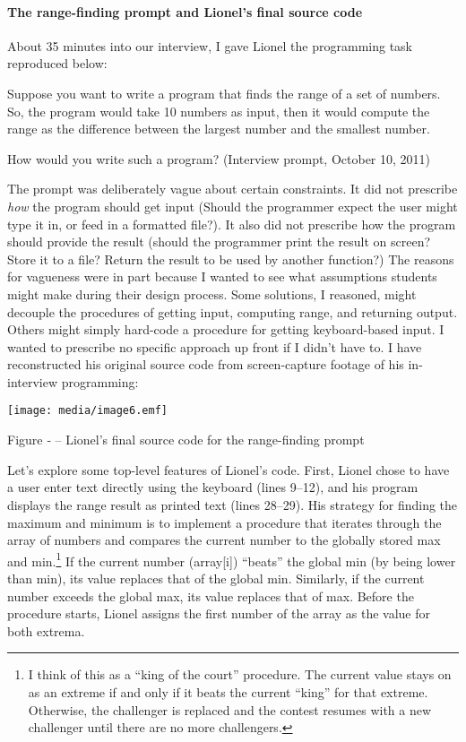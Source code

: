 \paragraph{The range-finding prompt and Lionel's final source
code}\label{the-range-finding-prompt-and-lionels-final-source-code}

About 35 minutes into our interview, I gave Lionel the programming task
reproduced below:

Suppose you want to write a program that finds the range of a set of
numbers. So, the program would take 10 numbers as input, then it would
compute the range as the difference between the largest number and the
smallest number.

How would you write such a program? (Interview prompt, October 10, 2011)

The prompt was deliberately vague about certain constraints. It did not
prescribe \emph{how} the program should get input (Should the programmer
expect the user might type it in, or feed in a formatted file?). It also
did not prescribe how the program should provide the result (should the
programmer print the result on screen? Store it to a file? Return the
result to be used by another function?) The reasons for vagueness were
in part because I wanted to see what assumptions students might make
during their design process. Some solutions, I reasoned, might decouple
the procedures of getting input, computing range, and returning output.
Others might simply hard-code a procedure for getting keyboard-based
input. I wanted to prescribe no specific approach up front if I didn't
have to. I have reconstructed his original source code from
screen-capture footage of his in-interview programming:

\texttt{[image: media/image6.emf]}

\protect\hypertarget{ux5fToc252445969}{}{}Figure ‑ -- Lionel's final
source code for the range-finding prompt

Let's explore some top-level features of Lionel's code. First, Lionel
chose to have a user enter text directly using the keyboard (lines
9--12), and his program displays the range result as printed text (lines
28--29). His strategy for finding the maximum and minimum is to
implement a procedure that iterates through the array of numbers and
compares the current number to the globally stored max and
min.\footnote{I think of this as a ``king of the court'' procedure. The
  current value stays on as an extreme if and only if it beats the
  current ``king'' for that extreme. Otherwise, the challenger is
  replaced and the contest resumes with a new challenger until there are
  no more challengers.} If the current number (array{[}i{]}) ``beats''
the global min (by being lower than min), its value replaces that of the
global min. Similarly, if the current number exceeds the global max, its
value replaces that of max. Before the procedure starts, Lionel assigns
the first number of the array as the value for both extrema.

